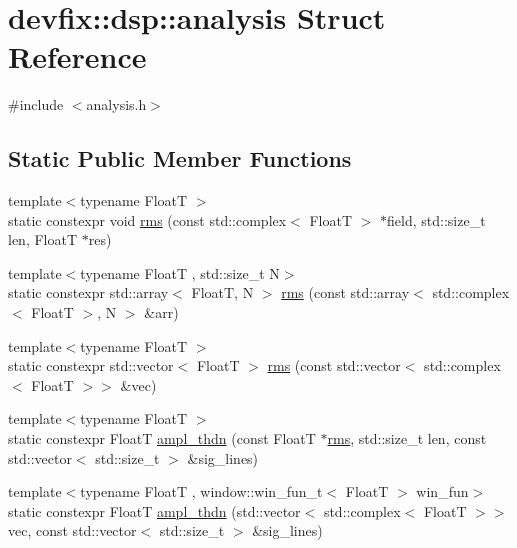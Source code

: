 \hypertarget{structdevfix_1_1dsp_1_1analysis}{}\section{devfix\+:\+:dsp\+:\+:analysis Struct Reference}
\label{structdevfix_1_1dsp_1_1analysis}


{\ttfamily \#include $<$analysis.\+h$>$}

\subsection*{Static Public Member Functions}
\begin{DoxyCompactItemize}
\item 
{\footnotesize template$<$typename FloatT $>$ }\\static constexpr void \hyperlink{structdevfix_1_1dsp_1_1analysis_aee4afbd42b3519c1827b49b21042ee37}{rms} (const std\+::complex$<$ FloatT $>$ $\ast$field, std\+::size\+\_\+t len, FloatT $\ast$res)
\item 
{\footnotesize template$<$typename FloatT , std\+::size\+\_\+t N$>$ }\\static constexpr std\+::array$<$ FloatT, N $>$ \hyperlink{structdevfix_1_1dsp_1_1analysis_a415630d073c18ee5ab1e270ee3845500}{rms} (const std\+::array$<$ std\+::complex$<$ FloatT $>$, N $>$ \&arr)
\item 
{\footnotesize template$<$typename FloatT $>$ }\\static constexpr std\+::vector$<$ FloatT $>$ \hyperlink{structdevfix_1_1dsp_1_1analysis_acad800a46b767f69e8df2940694614a4}{rms} (const std\+::vector$<$ std\+::complex$<$ FloatT $>$$>$ \&vec)
\item 
{\footnotesize template$<$typename FloatT $>$ }\\static constexpr FloatT \hyperlink{structdevfix_1_1dsp_1_1analysis_ae65db46c95c0f6bd98f9d2f26f7f8c4c}{ampl\+\_\+thdn} (const FloatT $\ast$\hyperlink{structdevfix_1_1dsp_1_1analysis_aee4afbd42b3519c1827b49b21042ee37}{rms}, std\+::size\+\_\+t len, const std\+::vector$<$ std\+::size\+\_\+t $>$ \&sig\+\_\+lines)
\item 
{\footnotesize template$<$typename FloatT , window\+::win\+\_\+fun\+\_\+t$<$ Float\+T $>$ win\+\_\+fun$>$ }\\static constexpr FloatT \hyperlink{structdevfix_1_1dsp_1_1analysis_a3448d6f6aeaf71facdac78999b3ad177}{ampl\+\_\+thdn} (std\+::vector$<$ std\+::complex$<$ FloatT $>$$>$ vec, const std\+::vector$<$ std\+::size\+\_\+t $>$ \&sig\+\_\+lines)
\end{DoxyCompactItemize}


